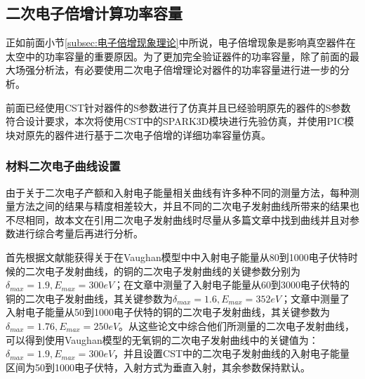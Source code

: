 \documentclass[master]{thesis-uestc}
\begin{document}
\subsection{二次电子倍增计算功率容量}\label{subsec:X二次电子倍增功率容量}
正如前面小节\ref{subsec:电子倍增现象理论}中所说，电子倍增现象是影响真空器件在太空中的功率容量的重要原因。为了更加完全验证器件的功率容量，除了前面的最大场强分析法，有必要使用二次电子倍增理论对器件的功率容量进行进一步的分析。

前面已经使用CST针对器件的S参数进行了仿真并且已经验明原先的器件的S参数符合设计要求，本次将使用CST中的SPARK3D模块进行先验仿真，并使用PIC模块对原先的器件进行基于二次电子倍增的详细功率容量仿真。

\subsubsection{材料二次电子曲线设置}
由于关于二次电子产额和入射电子能量相关曲线有许多种不同的测量方法，每种测量方法之间的结果与精度相差较大，并且不同的二次电子发射曲线所带来的结果也不尽相同，故本文在引用二次电子发射曲线时尽量从多篇文章中找到曲线并且对参数进行综合考量后再进行分析。

首先根据文献\cite{valizadeh_2014_wja}能获得关于在Vaughan模型中中入射电子能量从80到1000电子伏特时候的二次电子发射曲线，的铜的二次电子发射曲线的关键参数分别为$\delta_{max}=1.9, E_{max}=300 eV$；在文章\cite{bojko_2020_see}中测量了入射电子能量从60到3000电子伏特的铜的二次电子发射曲线，其关键参数为$\delta_{max}=1.6, E_{max}=352 eV$；文章\cite{jianweifang_lizi_2023}中测量了入射电子能量从50到1000电子伏特的铜的二次电子发射曲线，其关键参数为$\delta_{max}=1.76, E_{max}=250 eV$。从这些论文中综合他们所测量的二次电子发射曲线，可以得到使用Vaughan模型的无氧铜的二次电子发射曲线中的关键值为：$\delta_{max}=1.9, E_{max}=300 eV$，并且设置CST中的二次电子发射曲线的入射电子能量区间为50到1000电子伏特，入射方式为垂直入射，其余参数保持默认。
\end{document}

